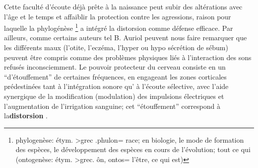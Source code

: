 Cette faculté d'écoute déjà prête à la naissance peut subir des
altérations avec l'âge et
le temps et affaiblir la protection contre les agressions, raison pour
laquelle la phylogénèse \footnote{ phylogenèse: étym. >grec .phulon=
  race; en biologie, le mode de formation des espèces, le développement
  des espèces en cours de l'évolution; tout ce qui (ontogenèse: étym. >grec. ôn, ontos= l'être,
ce qui est)}  a intégré la distorsion comme défense
efficace.
Par ailleurs, comme certains auteurs tel B. Auriol peuvent nous faire
remarquer que 
les différents maux (l'otite, l'eczéma, l'hyper
ou hypo sécrétion de sébum) peuvent être compris comme des problèmes physiques liés à l'interaction des sons refusés
inconsciemment\autocite [19--20] {auriol:cle}.
Le pouvoir protecteur du cerveau consiste en un  ``d'étouffement'' de
certaines fréquences,  en engageant les zones corticales prédestinées
tant à 
l'intégration sonore qu' à l'écoute sélective,  avec l'aide synergique de la
modification (modulation) des impulsions électriques et l'augmentation de
l'irrigation sanguine\autocite [14] {auriol:cle}; 
cet ``étouffement'' correspond à la\textbf{distorsion}
\autocite{tomatis:education}.

  




  




 




  

